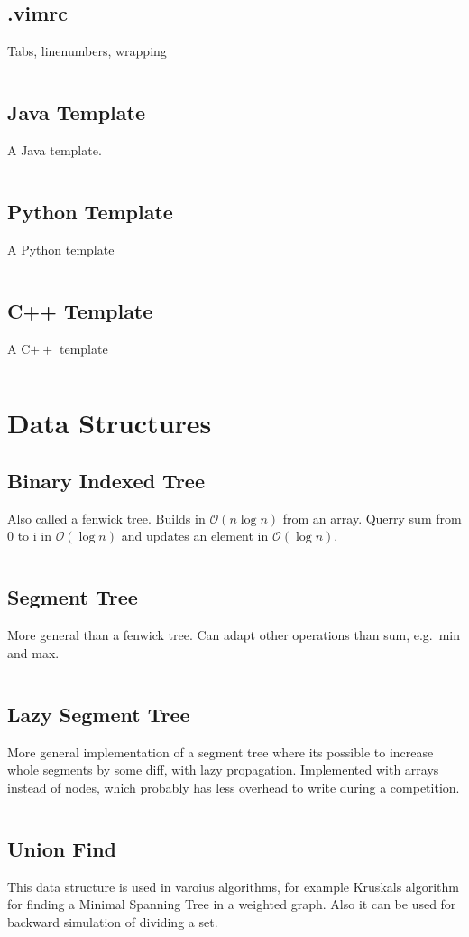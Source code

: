 \documentclass[8pt,a4paper,landscape,oneside]{amsart}
\newcommand{\codej}[1]{\inputminted[fontsize=\large,tabsize=2,baselinestretch=1]{java}{code/#1}}
\newcommand{\codec}[1]{\inputminted[fontsize=\large,tabsize=2,baselinestretch=1]{cpp}{code/#1}}
\newcommand{\codep}[1]{\inputminted[fontsize=\large,tabsize=2,baselinestretch=1]{py}{code/#1}}
\newcommand{\codev}[1]{\inputminted[fontsize=\large,tabsize=2,baselinestretch=1]{vim}{code/#1}}
\newcommand{\bigO}{\mathcal{O}}
\begin{document}
\begin{multicols*}{2}
\begin{large}
    \subsection{.vimrc}
        Tabs, linenumbers, wrapping
        \codev{.vimrc}
    \subsection{Java Template}
        A Java template.
        \codej{template.java}
    \subsection{Python Template}
        A Python template
        \codep{template.py}
    \subsection{C++ Template}
        A C$++$ template
        \codec{template.cpp}

\section{Data Structures}
    \subsection{Binary Indexed Tree}
        Also called a fenwick tree. Builds in $\bigO(n \log{n})$ from an array. Querry sum from 0 to i in $\bigO(\log{n})$ and updates an element in $\bigO(\log{n})$.
        \codej{DS/BIT.java}
    \subsection{Segment Tree}
        More general than a fenwick tree. Can adapt other operations than sum, e.g.\ min and max.
        \codej{DS/ST.java}
    \subsection{Lazy Segment Tree}
        More general implementation of a segment tree where its possible to increase whole segments by some diff, with lazy propagation. Implemented with arrays instead of nodes, which probably has less overhead to write during a competition.
        \codej{DS/LazySegmentTree.java}
    \subsection{Union Find}
        This data structure is used in varoius algorithms, for example Kruskals algorithm for finding a Minimal Spanning Tree in a weighted graph. Also it can be used for backward simulation of dividing a set.
        \codej{DS/UF.java}

\end{large}
\end{multicols*}
\end{document}
